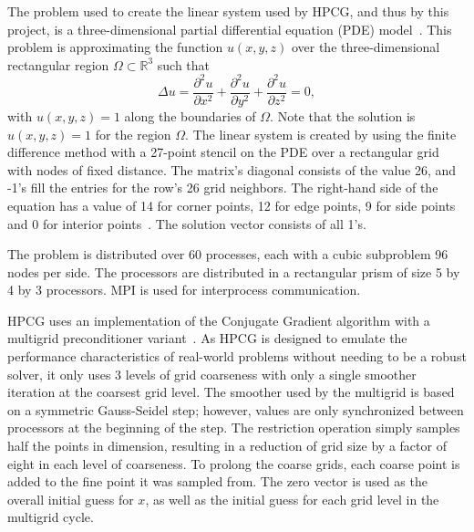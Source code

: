 The problem used to create the linear system used by HPCG, and thus by this project, is a three-dimensional partial differential equation (PDE) model~\cite{Dongarra:2015:HPCG}.
This problem is approximating the function \(u(x, y, z)\) over the three-dimensional rectangular region \(\Omega\subset\mathbb{R}^3\) such that
\[
	\Delta u = \frac{\partial^2 u}{\partial x^2} + \frac{\partial^2 u}{\partial y^2} + \frac{\partial^2 u}{\partial z^2} = 0,
\] with \(u(x, y, z) = 1\) along the boundaries of \(\Omega\).
Note that the solution is \(u(x, y, z) = 1\) for the region \(\Omega\).
The linear system is created by using the finite difference method with a 27-point stencil on the PDE over a rectangular grid with nodes of fixed distance.
The matrix's diagonal consists of the value 26, and -1's fill the entries for the row's 26 grid neighbors.
The right-hand side of the equation has a value of 14 for corner points, 12 for edge points, 9 for side points and 0 for interior points~\cite{Kincaid:2009:Numerical}.
The solution vector consists of all 1's.

The problem is distributed over 60 processes, each with a cubic subproblem 96 nodes per side.
The processors are distributed in a rectangular prism of size 5 by 4 by 3 processors.
MPI is used for interprocess communication.

HPCG uses an implementation of the Conjugate Gradient algorithm with a multigrid preconditioner variant~\cite{Dongarra:2015:HPCG}.
As HPCG is designed to emulate the performance characteristics of real-world problems without needing to be a robust solver, it only uses 3 levels of grid coarseness with only a single smoother iteration at the coarsest grid level.
The smoother used by the multigrid is based on a symmetric Gauss-Seidel step; however, values are only synchronized between processors at the beginning of the step.
The restriction operation simply samples half the points in dimension, resulting in a reduction of grid size by a factor of eight in each level of coarseness.
To prolong the coarse grids, each coarse point is added to the fine point it was sampled from.
The zero vector is used as the overall initial guess for \(x\), as well as the initial guess for each grid level in the multigrid cycle.

